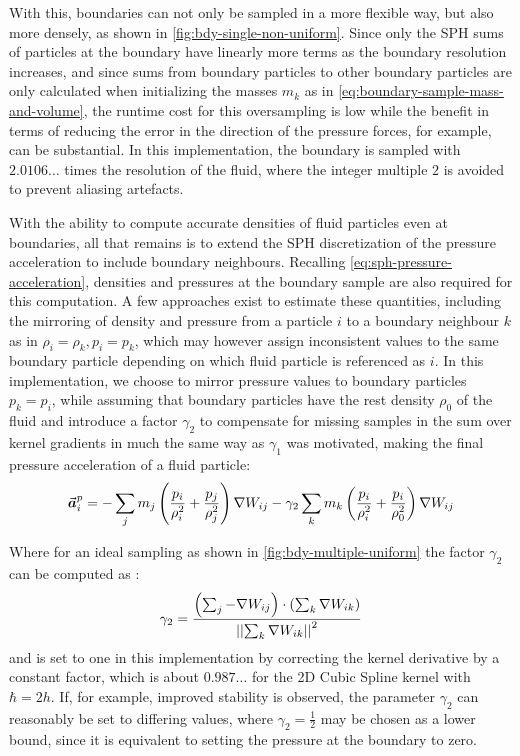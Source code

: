 With this, boundaries can not only be sampled in a more flexible way, but also more densely, as shown in \autoref{fig:bdy-single-non-uniform}. Since only the SPH sums of particles at the boundary have linearly more terms as the boundary resolution increases, and since sums from boundary particles to other boundary particles are only calculated when initializing the masses $m_k$ as in \autoref{eq:boundary-sample-mass-and-volume}, the runtime cost for this oversampling is low while the benefit in terms of reducing the error in the direction of the pressure forces, for example, can be substantial. In this implementation, the boundary is sampled with $2.0106\dots$ times the resolution of the fluid, where the integer multiple $2$ is avoided to prevent aliasing artefacts.

With the ability to compute accurate densities of fluid particles even at boundaries, all that remains is to extend the SPH discretization of the pressure acceleration to include boundary neighbours. Recalling \autoref{eq:sph-pressure-acceleration}, densities and pressures at the boundary sample are also required for this computation. A few approaches exist to estimate these quantities, including the mirroring of density and pressure from a particle $i$ to a boundary neighbour $k$ as in $\rho_i=\rho_k, p_i=p_k$, which may however assign inconsistent values to the same boundary particle depending on which fluid particle is referenced as $i$. In this implementation, we choose to mirror pressure values to boundary particles $p_k = p_i$, while assuming that boundary particles have the rest density $\rho_0$ of the fluid and introduce a factor $\gamma_2$ to compensate for missing samples in the sum over kernel gradients in much the same way as $\gamma_1$ was motivated, making the final pressure acceleration of a fluid particle:
\begin{equation}
  \vec{\bm{a}}^p_i =
  -\sum_j
  m_j
  \left(\frac{p_i}{\rho_i^2} + \frac{p_j}{\rho_j^2}\right)
  \nabla W_{ij}
  - \gamma_2 \sum_k
  m_k
  \left(\frac{p_i}{\rho_i^2} + \frac{p_i}{\rho_0^2}\right)
  \nabla W_{ij}
\end{equation}

Where for an ideal sampling as shown in \autoref{fig:bdy-multiple-uniform} the factor $\gamma_2$ can be computed as \autocite*{tutorial}:
\begin{equation}
  \gamma_2 = \frac{
    \left(\sum_j -\nabla W_{ij}\right)
    \cdot
    \left(\sum_k \nabla W_{ik}\right)
  }{
    \left|\left|\sum_k \nabla W_{ik}\right|\right|^2
  }
\end{equation}
and is set to one in this implementation by correcting the kernel derivative by a constant factor, which is about $0.987\dots$ for the 2D Cubic Spline kernel with $\hbar = 2h$. If, for example, improved stability is observed, the parameter $\gamma_2$ can reasonably be set to differing values, where $\gamma_2 = \frac{1}{2}$ may be chosen as a lower bound, since it is equivalent to setting the pressure at the boundary to zero.

